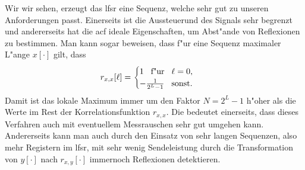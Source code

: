 \begin{listing}[ht]
\begin{minipage}{0.48\textwidth}
    \end{minipage}
    \label{py:radar2}
\end{listing}

Wir wir sehen, erzeugt das \gls{lfsr} eine Sequenz, welche sehr gut zu unseren Anforderungen passt. 
Einerseits ist die Aussteuerund des Signals sehr begrenzt und andererseits hat die \gls{acf} ideale Eigenschaften, um Abst"ande von Reflexionen zu bestimmen.
Man kann sogar beweisen, dass f"ur eine Sequenz maximaler L"ange $x[\cdot]$ gilt, dass
\begin{equation}
    r_{x,x}[\ell] = \begin{cases}
        1 {\hspace{3mm} \text{f"ur} \hspace{3mm}} \ell = 0, \\
        -\frac{1}{2^L -1} {\hspace{3mm} \text{sonst.} \hspace{3mm}}
    \end{cases}
\end{equation}
Damit ist das lokale Maximum immer um den Faktor $N = 2^L-1$ h"oher als die Werte im Rest der Korrelationsfunktion $r_{x,x}$. 
Die bedeutet einerseits, dass dieses Verfahren auch mit eventuellem Messrauschen sehr gut umgehen kann.
Andererseits kann man auch durch den Einsatz von sehr langen Sequenzen, also mehr Registern im \gls{lfsr}, mit sehr wenig Sendeleistung durch die Transformation von $y[\cdot]$ nach $r_{x,y}[\cdot]$ immernoch Reflexionen detektieren.
